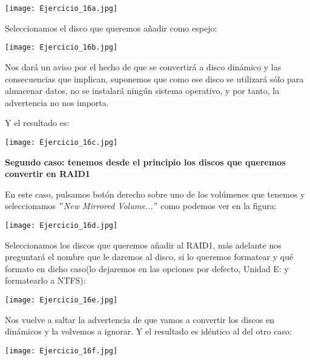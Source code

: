 \documentclass[paper=a4, fontsize=11pt]{scrartcl} %
\numberwithin{equation}{section} %
\numberwithin{figure}{section} %
\numberwithin{table}{section} %
\begin{document}
\begin{enumerate}
		\texttt{[image: Ejercicio\_16a.jpg]}
		
		Seleccionamos el disco que queremos añadir como espejo:
		
		\texttt{[image: Ejercicio\_16b.jpg]}
		
		Nos dará un aviso por el hecho de que se convertirá a disco dinámico y las consecuencias que
		implican, suponemos que como ese disco se utilizará sólo para almacenar datos, no se instalará
		ningún sistema operativo, y por tanto, la advertencia no nos importa.
		
		Y el resultado es:
		
		\texttt{[image: Ejercicio\_16c.jpg]}
		
		\textbf{Segundo caso: tenemos desde el principio los discos que queremos convertir en RAID1}
		
		En este caso, pulsamos botón derecho sobre uno de los volúmenes que tenemos y seleccionamos
		\textit{$"$New Mirrored Volume...$"$} como podemos ver en la figura:
		
		\texttt{[image: Ejercicio\_16d.jpg]}
		
		Seleccionamos los discos que queremos añadir al RAID1, más adelante nos preguntará el nombre
		que le daremos al disco, si lo queremos formatear y qué formato en dicho caso(lo dejaremos
		en las opciones por defecto, Unidad E: y formatearlo a NTFS):
		
		\texttt{[image: Ejercicio\_16e.jpg]}
		
		Nos vuelve a saltar la advertencia de que vamos a convertir los discos en dinámicos y la 
		volvemos a ignorar. Y el resultado es idéntico al del otro caso:
		
		\texttt{[image: Ejercicio\_16f.jpg]}
		
		
		

\end{enumerate}
\end{document}
